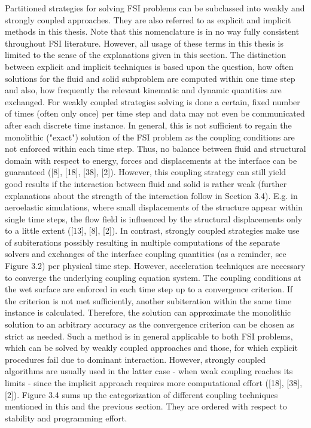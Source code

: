 Partitioned strategies for solving FSI problems can be subclassed into weakly and strongly coupled approaches.
They are also referred to as explicit and implicit methods in this thesis. Note that this
nomenclature is in no way fully consistent throughout FSI literature. However, all usage of these terms
in this thesis is limited to the sense of the explanations given in this section.
The distinction between explicit and implicit techniques is based upon the question, how often solutions
for the fluid and solid subproblem are computed within one time step and also, how frequently the
relevant kinematic and dynamic quantities are exchanged. For weakly coupled strategies solving is done
a certain, fixed number of times (often only once) per time step and data may not even be communicated
after each discrete time instance. In general, this is not sufficient to regain the monolithic ("exact")
solution of the FSI problem as the coupling conditions are not enforced within each time step. Thus,
no balance between fluid and structural domain with respect to energy, forces and displacements at the
interface can be guaranteed ([8], [18], [38], [2]). However, this coupling strategy can still yield good
results if the interaction between fluid and solid is rather weak (further explanations about the strength
of the interaction follow in Section 3.4). E.g. in aeroelastic simulations, where small displacements of
the structure appear within single time steps, the flow field is influenced by the structural displacements
only to a little extent ([13], [8], [2]).
In contrast, strongly coupled strategies make use of subiterations possibly resulting in multiple computations
of the separate solvers and exchanges of the interface coupling quantities (as a reminder, see Figure 3.2) per physical time step. However, acceleration techniques are necessary to converge the underlying
coupling equation system. The coupling conditions at the wet surface are enforced in each time step up to
a convergence criterion. If the criterion is not met sufficiently, another subiteration within the same time
instance is calculated. Therefore, the solution can approximate the monolithic solution to an arbitrary
accuracy as the convergence criterion can be chosen as strict as needed. Such a method is in general
applicable to both FSI problems, which can be solved by weakly coupled approaches and those, for which
explicit procedures fail due to dominant interaction. However, strongly coupled algorithms are usually
used in the latter case - when weak coupling reaches its limits - since the implicit approach requires more
computational effort ([18], [38], [2]).
Figure 3.4 sums up the categorization of different coupling techniques mentioned in this and the previous
section. They are ordered with respect to stability and programming effort.

